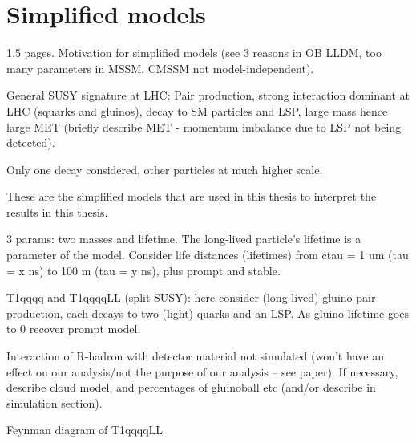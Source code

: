 \section{Simplified models}
\label{sec:theory-simplifiedmodels}
1.5 pages. Motivation for simplified models (see 3 reasons in OB LLDM, too many 
parameters in MSSM. CMSSM not model-independent).

General SUSY signature at LHC: Pair production, strong interaction dominant at 
LHC (squarks and gluinos), decay to SM particles and LSP, large mass hence 
large MET (briefly describe MET - momentum imbalance due to LSP not being 
detected).

Only one decay considered, other particles at much higher scale.

These are the simplified models that are used in this thesis to interpret the 
results in this thesis.

3 params: two masses and lifetime.
The long-lived particle's lifetime is a parameter of the model. Consider life 
distances (lifetimes) from ctau = 1 um (tau = x ns) to 100 m (tau = y ns), plus 
prompt and stable.



T1qqqq and T1qqqqLL (split SUSY): here consider (long-lived) gluino pair 
production, each decays to two (light) quarks and an LSP. As gluino lifetime 
goes to 0 recover prompt model.

Interaction of R-hadron with detector material not simulated (won't have an 
effect on our analysis/not the purpose of our analysis -- see paper). If 
necessary, describe cloud model, and percentages of gluinoball etc (and/or 
describe in simulation section).

Feynman diagram of T1qqqqLL %



